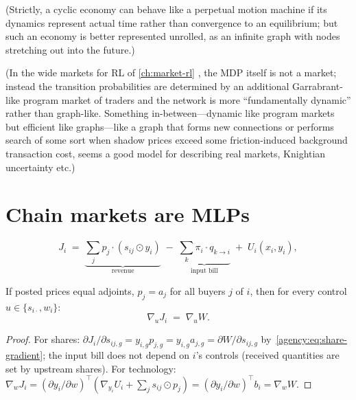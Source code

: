 (Strictly, a cyclic economy can behave like a perpetual motion machine if its dynamics
represent actual time rather than convergence to an equilibrium; but such an economy is
better represented unrolled, as an infinite graph with nodes stretching out into the
future.)

(In the wide markets for RL of \cref{ch:market-rl} \citep{pallavisudhirMarketbasedArchitectures2025},
the MDP itself is not a market; instead the transition probabilities are determined by an additional Garrabrant-like
program market of traders and the network is more ``fundamentally dynamic'' rather than
graph-like. Something in-between---dynamic like program markets but efficient like
graphs---like a graph that forms new connections or performs search of some sort when shadow
prices exceed some friction-induced background transaction cost, seems a good model for
describing real markets, Knightian uncertainty etc.)

\section{Chain markets are MLPs}\label{agency:sec:mlp}

\[J_i \;=\; \underbrace{\sum_j p_j \cdot (s_{ij} \odot y_i)}_{\text{revenue}}
      \;-\; \underbrace{\sum_k \pi_i \cdot q_{k \to i}}_{\text{input bill}}
      \;+\; U_i(x_i, y_i),\]

\begin{lemma}[alignment]\label{agency:lem:alignment}
If posted prices equal adjoints, $p_j = a_j$ for all buyers $j$ of $i$, then for every
control $u \in \{s_{i\cdot}, w_i\}$:
\[\nabla_u J_i \;=\; \nabla_u W .\]
\end{lemma}

\begin{proof}
For shares:
$\partial J_i / \partial s_{ij,g} = y_{i,g} p_{j,g} = y_{i,g} a_{j,g} = \partial W / \partial s_{ij,g}$
by~\eqref{agency:eq:share-gradient}; the input bill does not depend on $i$'s controls
(received quantities are set by upstream shares). For technology:
$\nabla_{w} J_i = (\partial y_i/\partial w)^\top (\nabla_{y_i} U_i + \sum_j s_{ij} \odot p_j) = (\partial y_i / \partial w)^\top b_i = \nabla_w W$.
\end{proof}

